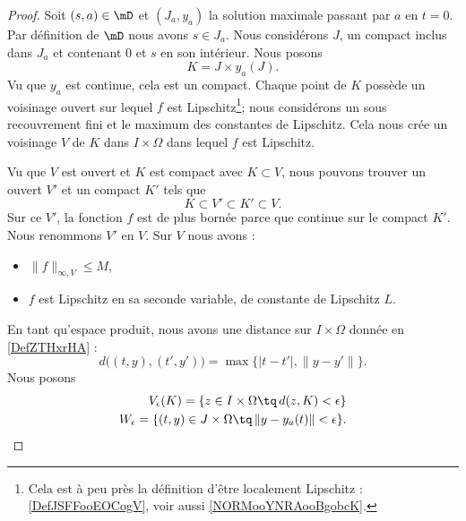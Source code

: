 \begin{proof}
    Soit \( (s,a)\in\mD\) et \( (J_a,y_a)\) la solution maximale passant par \( a\) en \( t=0\). Par définition de \( \mD\) nous avons \( s\in J_a\). Nous considérons \( J\), un compact inclus dans \( J_a\) et contenant \( 0\) et \( s\) en son intérieur. Nous posons
    \begin{equation}
        K=J\times y_a(J).
    \end{equation}
    Vu que \( y_a\) est continue, cela est un compact. Chaque point de \( K\) possède un voisinage ouvert sur lequel \( f\) est Lipschitz\footnote{Cela est à peu près la définition d'être localement Lipschitz : \ref{DefJSFFooEOCogV}, voir aussi \ref{NORMooYNRAooBgobcK}.}; nous considérons un sous recouvrement fini et le maximum des constantes de Lipschitz. Cela nous crée un voisinage \( V\) de \( K\) dans \( I\times \Omega\) dans lequel \( f\) est Lipschitz.

    Vu que \( V\) est ouvert et \( K\) est compact avec \( K\subset V\), nous pouvons trouver un ouvert \( V'\) et un compact \( K'\) tels que
    \begin{equation}
        K\subset V'\subset K'\subset V.
    \end{equation}
    Sur ce \( V'\), la fonction \( f\) est de plus bornée parce que continue sur le compact \( K'\). Nous renommons \( V'\) en \( V\). Sur \( V\) nous avons :
    \begin{itemize}
        \item \( \| f \|_{\infty,V}\leq M\),
        \item \( f\) est Lipschitz en sa seconde variable, de constante de Lipschitz \( L\).
    \end{itemize}
    

    En tant qu'espace produit, nous avons une distance sur \( I\times \Omega\) donnée en \ref{DefZTHxrHA} :
    \begin{equation}
        d\big( (t,y),(t',y') \big)=\max\big\{  | t-t' |,\| y-y' \|   \big\}.
    \end{equation}
    Nous posons
    \begin{subequations}
        \begin{align}
            V_{\epsilon}(K)=\{ z\in I\times \Omega \tq\,d(z,K)<\epsilon  \}\\
            W_{\epsilon}=\{ (t,y)\in J\times \Omega\tq\,\| y- y_a(t) \|<\epsilon \}.
        \end{align}
    \end{subequations}
    

\end{proof}
